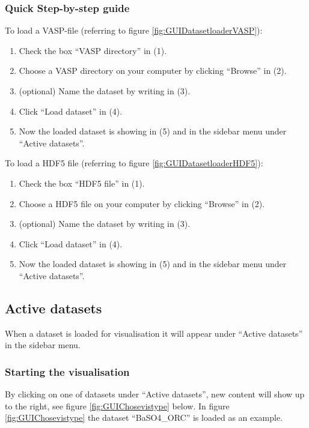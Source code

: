 \subsubsection{Quick Step-by-step guide}
\label{sec:Dataset step-by-step}
To load a VASP-file (referring to figure \ref{fig:GUIDatasetloaderVASP}):
\begin{enumerate}
    \item Check the box ``VASP directory'' in (1).
    \item Choose a VASP directory on your computer by clicking ``Browse'' in (2).
    \item (optional) Name the dataset by writing in (3).
    \item Click ``Load dataset'' in (4).
    \item Now the loaded dataset is showing in (5) and in the sidebar menu under ``Active datasets''.
\end{enumerate}

To load a HDF5 file (referring to figure \ref{fig:GUIDatasetloaderHDF5}):
\begin{enumerate}
    \item Check the box ``HDF5 file'' in (1).
    \item Choose a HDF5 file on your computer by clicking ``Browse'' in (2).
    \item (optional) Name the dataset by writing in (3).
    \item Click ``Load dataset'' in (4).
    \item Now the loaded dataset is showing in (5) and in the sidebar menu under ``Active datasets''.
\end{enumerate}

\subsection{Active datasets}
When a dataset is loaded for visualisation it will appear under ``Active datasets'' in the sidebar menu. 

\subsubsection{Starting the visualisation}
By clicking on one of datasets under ``Active datasets'', new content will show up to the right, see figure \ref{fig:GUIChosevistype} below. In figure \ref{fig:GUIChosevistype} the dataset ``BaSO4\_ORC'' is loaded as an example.

